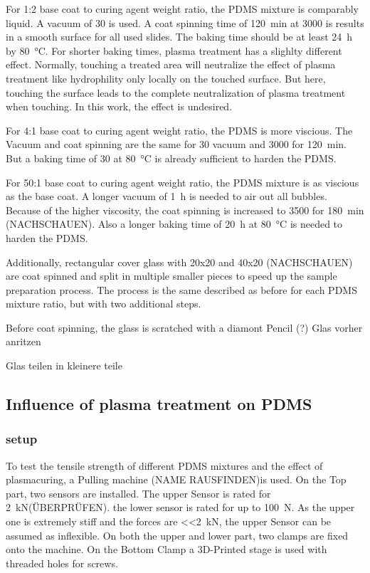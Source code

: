 For 1:2 base coat to curing agent weight ratio, the PDMS mixture is comparably liquid. A vacuum of \SI{30}{\min} is used. A coat spinning time of \SI{120}{\minute} at \SI{3000}{\rpm} is results in a smooth surface for all used slides. The baking time should be at least \SI{24}{\hour} by \SI{80}{\degreeCelsius}. For shorter baking times, plasma treatment has a slighlty different effect. Normally, touching a treated area will neutralize the effect of plasma treatment like hydrophility only locally on the touched surface. But here, touching the surface leads to the complete neutralization of plasma treatment when touching. In this work, the effect is undesired. 
 
For 4:1 base coat to curing agent weight ratio, the PDMS is more viscious. The Vacuum and coat spinning are the same for \SI{30}{\min} vacuum and \SI{3000}{\rpm} for \SI{120}{\minute}. But a baking time of \SI{30}{\min} at \SI{80}{\degreeCelsius} is already sufficient to harden the PDMS. 

For 50:1 base coat to curing agent weight ratio, the PDMS mixture is as viscious as the base coat. A longer vacuum of \SI{1}{\hour} is needed to air out all bubbles. Because of the higher viscosity, the coat spinning is increased to \SI{3500}{\rpm} for \SI{180}{\minute} (NACHSCHAUEN). Also a longer baking time of \SI{20}{\hour} at \SI{80}{\degreeCelsius} is needed to harden the PDMS. 

Additionally, rectangular cover glass with 20x20 and 40x20 (NACHSCHAUEN) are coat spinned and split in multiple smaller pieces to speed up the sample preparation process. The process is the same described as before for each PDMS mixture ratio, but with two additional steps.

Before coat spinning, the glass is scratched with a diamont Pencil (?)
Glas vorher anritzen

Glas teilen in kleinere teile


\subsection{Influence of plasma treatment on PDMS}

\subsubsection{setup}

To test the tensile strength of different PDMS mixtures and the effect of plasmacuring, a Pulling machine (NAME RAUSFINDEN)is used. 
On the Top part, two sensors are installed. The upper Sensor is rated for \SI{2}{\kilo\newton}(ÜBERPRÜFEN). the lower sensor is rated for up to \SI{100}{\newton}. As the upper one is extremely stiff and the forces are \SI{<<2}{\kilo\newton}, the upper Sensor can be assumed as inflexible. On both the upper and lower part, two clamps are fixed onto the machine. On the Bottom Clamp a 3D-Printed stage is used with threaded holes for screws. 


